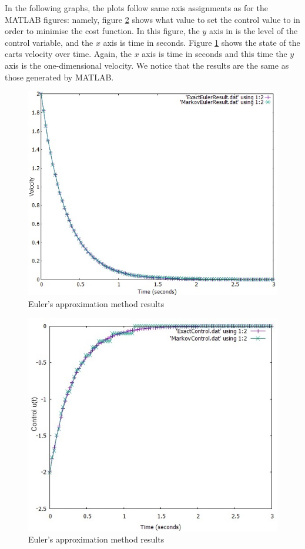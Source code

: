 \documentclass[11pt,draftd]{article}
\begin{document}
In the following graphs, the plots follow same axis assignments as for the MATLAB figures: namely, figure \ref{gnuplot-control} shows what value to set the control value to in order to minimise the cost function. In this figure, the $ y $ axis in is the level of the control variable, and the $ x $ axis is time in seconds. Figure \ref{gnuplot-state} shows the state of the carts velocity over time. Again, the $ x $ axis is time in seconds and this time the $ y $ axis is the one-dimensional velocity. We notice that the results are the same as those generated by MATLAB. 

\begin{figure}[h!]
	\centering
	\label{gnuplot-state}
	\includegraphics[scale = 0.55]{EulersApproximateStateC++}
	\caption{Euler's approximation method results}
\end{figure}
\begin{figure}[h!]
	\centering
	\label{gnuplot-control}
	\includegraphics[scale = 0.6]{EulersApproximateControlC++}
	\caption{Euler's approximation method results}
\end{figure}
\end{document}
